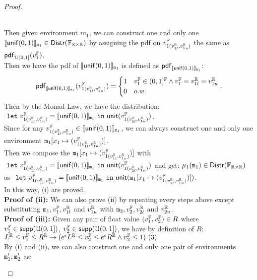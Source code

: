 \documentclass[a4paper,11pt]{article}
\begin{document}
\begin{proof}
\begin{itemize}
\begin{subproof}
	\\
	Then given environment $m_1$,
	we can construct one and only one $\llbracket \mathsf{unif}(0, 1) \rrbracket_{\mathtt{m}_1} \in \mathsf{Distr}(\mathbb{F}_{\mathbb{R} \times \mathbb{R}})$
	by assigning the pdf on $v^{\mathbb{F}}_{1(v^{\mathbb{R}}_{1l}, v^{\mathbb{R}}_{1u})}$ the same as $\mathsf{pdf}_{\mathcal{U}(0,1]}(v^{\mathbb{F}}_1)$. 
	\\
	Then we have the pdf of $\llbracket \mathsf{unif}(0, 1) \rrbracket_{\mathtt{m}_1}$  
	is defined as $\mathsf{pdf}_{\llbracket \mathsf{unif}(0, 1) \rrbracket_{\mathtt{m}_1}}$:
	\[
	\mathsf{pdf}_{\llbracket \mathsf{unif}(0, 1) \rrbracket_{\mathtt{m}_1}}(v^{\mathbb{F}}_{1(v^{\mathbb{R}}_{1l}, v^{\mathbb{R}}_{1u})}) = 
		\begin{cases}
		1 & v^{\mathbb{F}}_1 \in (0,1]^{\mathbb{F}}
		\land  v^{\mathbb{F}}_1 = v^{\mathbb{R}}_{1l} = v^{\mathbb{R}}_{1u}
		\\
		0       & o.w.
		\end{cases},
	\]
	Then by the Monad Law, we have the distribution:
	$~\mathtt{let}~ v^{\mathbb{F}}_{1(v^{\mathbb{R}}_{1l}, v^{\mathbb{R}}_{1u})} = \llbracket \mathsf{unif}(0, 1) \rrbracket_{\mathtt{m}_1} 
	~\mathtt{in}~ \mathsf{unit}(v^{\mathbb{F}}_{1(v^{\mathbb{R}}_{1l}, v^{\mathbb{R}}_{1u})})$.
	\\
	Since for any $v^{\mathbb{F}}_{1(v^{\mathbb{R}}_{1l}, v^{\mathbb{R}}_{1u})} \in \llbracket \mathsf{unif}(0, 1) \rrbracket_{\mathtt{m}_1}$, 
	we can always construct one and only one environment $\mathtt{m}_1[x_1 \mapsto (v^{\mathbb{F}}_{1(v^{\mathbb{R}}_{1l}, v^{\mathbb{R}}_{1u})})]$.
	\\
	Then we compose the  
	$\mathtt{m}_1[x_1 \mapsto (v^{\mathbb{F}}_{1(v^{\mathbb{R}}_{1l}, v^{\mathbb{R}}_{1u})})]$
	with $~\mathtt{let}~ v^{\mathbb{F}}_{1(v^{\mathbb{R}}_{1l}, v^{\mathbb{R}}_{1u})} = \llbracket \mathsf{unif}(0, 1) \rrbracket_{\mathtt{m}_1} 
	~\mathtt{in}~ \mathsf{unit}(v^{\mathbb{F}}_{1(v^{\mathbb{R}}_{1l}, v^{\mathbb{R}}_{1u})})$ and get:
	$\mu_1(\mathtt{m}_1) \in \mathsf{Distr}(\mathbb{F}_{\mathbb{R} \times \mathbb{R}})$ as 
	$~\mathtt{let}~ v^{\mathbb{F}}_{1(v^{\mathbb{R}}_{1l}, v^{\mathbb{R}}_{1u})} = \llbracket \mathsf{unif}(0, 1) \rrbracket_{\mathtt{m}_1} 
	~\mathtt{in}~ \mathsf{unit}(\mathtt{m}_1[x_1 \mapsto (v^{\mathbb{F}}_{1(v^{\mathbb{R}}_{1l}, v^{\mathbb{R}}_{1u})})])$.
	\\
	In this way, (i) are proved.
	\\
	\textbf{Proof of (ii):} 
	We can also prove (ii) by repeating every steps above except substituting $\mathtt{m}_1, v^{\mathbb{F}}_1, v^{\mathbb{R}}_{1l}$ and $v^{\mathbb{R}}_{1u}$ with $\mathtt{m}_2, v^{\mathbb{F}}_2, v^{\mathbb{R}}_{2l}$ and $v^{\mathbb{R}}_{2u}$.
	\\
	\textbf{Proof of (iii):} 
	Given any pair of float value $(v^{\mathbb{F}}_1, v^{\mathbb{F}}_2) \in R$ where 
	$v^{\mathbb{F}}_1 \in \mathsf{supp}(\mathcal{U}(0,1])$, 
	$v^{\mathbb{F}}_2 \in \mathsf{supp}(\mathcal{U}(0,1])$, we have by definition of $R$:
	\\
	$L^{\mathbb{R}} \leq v^{\mathbb{F}}_1 \leq R^{\mathbb{R}} \rightarrow
	(e^{\epsilon} L^{\mathbb{R}} \leq v^{\mathbb{F}}_2 \leq 	e^{\epsilon} R^{\mathbb{R}}
	\land v^{\mathbb{F}}_2 \leq 1)
	 ~ (3)$
	\\
	By (i) and (ii), we can also construct one and only one pair of environments $\mathtt{m}_1', \mathtt{m}_2'$ as:

\end{subproof}
\end{itemize}
\end{proof}
\end{document}
